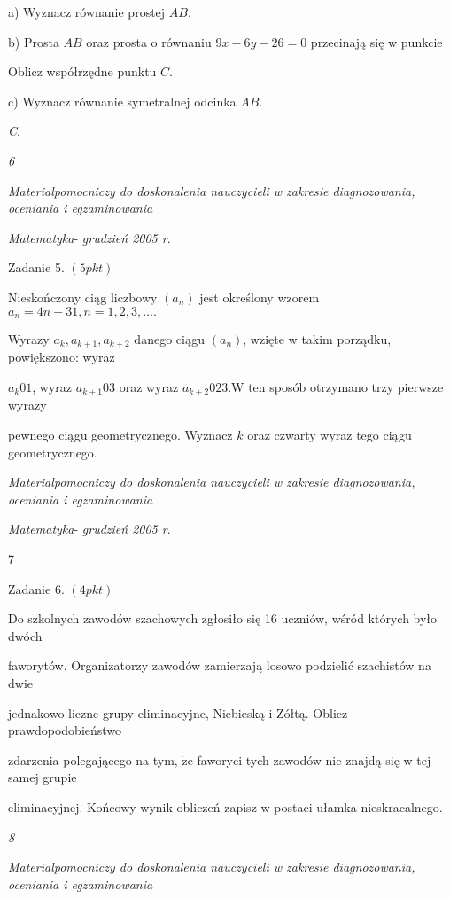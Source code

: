 \documentclass[a4paper,12pt]{article}
\begin{document}
a) Wyznacz równanie prostej $AB.$

b) Prosta $AB$ oraz prosta o równaniu $9x-6y-26=0$ przecinają się w punkcie

Oblicz współrzędne punktu $C.$

c) Wyznacz równanie symetralnej odcinka $AB.$

{\it C}.





{\it 6}

{\it Materialpomocniczy do doskonalenia nauczycieli w zakresie diagnozowania, oceniania i egzaminowania}

{\it Matematyka}- {\it grudzień 2005 r}.

Zadanie 5. $(5pkt)$

Nieskończony ciąg liczbowy $(a_{n})$ jest określony wzorem $a_{n}=4n-31, n=1,2,3,\ldots.$

Wyrazy $a_{k}, a_{k+1}, a_{k+2}$ danego ciągu $(a_{n})$, wzięte w takim porządku, powiększono: wyraz

$a_{k} 01$, wyraz $a_{k+1} 03$ oraz wyraz $a_{k+2}023. \mathrm{W}$ ten sposób otrzymano trzy pierwsze wyrazy

pewnego ciągu geometrycznego. Wyznacz $k$ oraz czwarty wyraz tego ciągu geometrycznego.





{\it Materialpomocniczy do doskonalenia nauczycieli w zakresie diagnozowania, oceniania i egzaminowania}

{\it Matematyka}- {\it grudzień 2005 r}.

7

Zadanie 6. $(4pkt)$

Do szkolnych zawodów szachowych zgłosiło się 16 uczniów, wśród których było dwóch

faworytów. Organizatorzy zawodów zamierzają losowo podzielić szachistów na dwie

jednakowo liczne grupy eliminacyjne, Niebieską i Zółtą. Oblicz prawdopodobieństwo

zdarzenia polegającego na tym, $\dot{\mathrm{z}}\mathrm{e}$ faworyci tych zawodów nie znajdą się w tej samej grupie

eliminacyjnej. Końcowy wynik obliczeń zapisz w postaci ułamka nieskracalnego.





{\it 8}

{\it Materialpomocniczy do doskonalenia nauczycieli w zakresie diagnozowania, oceniania i egzaminowania}
\end{document}
